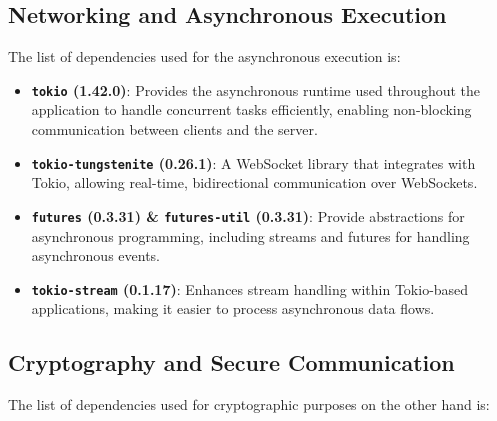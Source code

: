 \subsection{Networking and Asynchronous Execution}
\label{subsec:NetworkingAndAsynchronousExecution}

The list of dependencies used for the asynchronous execution is:

\begin{itemize}
  \item \textbf{\texttt{tokio} (1.42.0)}: Provides the asynchronous runtime used throughout the application to handle concurrent tasks efficiently, enabling non-blocking communication between clients and the server.
  \item \textbf{\texttt{tokio-tungstenite} (0.26.1)}: A WebSocket library that integrates with Tokio, allowing real-time, bidirectional communication over WebSockets.
  \item \textbf{\texttt{futures} (0.3.31) \& \texttt{futures-util} (0.3.31)}: Provide abstractions for asynchronous programming, including streams and futures for handling asynchronous events.
  \item \textbf{\texttt{tokio-stream} (0.1.17)}: Enhances stream handling within Tokio-based applications, making it easier to process asynchronous data flows.
\end{itemize}

\subsection{Cryptography and Secure Communication}
\label{subsec:CryptographyAndSecureCommunication}

The list of dependencies used for cryptographic purposes on the other hand is:

